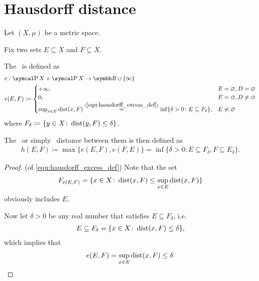\section{Hausdorff distance}\label{sec:hausdorff_distance}

Let $(X, \mu)$ be a metric space.

\begin{definition}\label{def:hausdorff_distance}\cite[144]{Dontchev2014}
  Fix two sets $E \subseteq X$ and $F \subseteq X$.

  The~ is defined as
  \begin{align}\label{equ:hausdorff_excess_def}
    &e: \Power X \times \Power X \to \BB{R} \cup \{ \infty \} \\ \nonumber
    &e(E, F) \coloneqq \begin{cases}
      +\infty, &E = \varnothing, D = \varnothing \\
      0, &E = \varnothing, D \neq \varnothing \\
      \sup_{x \in E} \Dist(x, F) \stackrel{(\ref{equ:hausdorff_excess_def})}{=} \inf \{\delta > 0 \colon E \subseteq F_\delta \}, &E \neq \varnothing \nonumber\refstepcounter{equation}
    \end{cases}
  \end{align}
  where $F_\delta \coloneqq \{ y \in X \colon \operatorname{dist}(y, F) \leq \delta \}$.

  The~ or simply~ distance between them is then defined as
  \begin{align*}
    h(E, F) \coloneqq \max\{ e(E, F), e(F, E) \} = \inf \{\delta > 0 \colon E \subseteq F_\delta, F \subseteq E_\delta \}.
  \end{align*}
\end{definition}
\begin{proof}(of \ref{equ:hausdorff_excess_def})
  Note that the set
  \begin{align*}
    F_{e(E, F)} = \{ x \in X \colon \operatorname{dist}(x, F) \leq \sup_{x \in E} \operatorname{dist}(x, F) \}
  \end{align*}
  obviously includes $E$.

  Now let $\delta > 0$ be any real number that satisfies $E \subseteq F_\delta$, i.e.
  \begin{align*}
    E \subseteq F_\delta = \{ x \in X \colon \operatorname{dist}(x, F) \leq \delta \},
  \end{align*}
  which implies that
  \begin{align*}
    e(E, F) = \sup_{x \in E} \operatorname{dist}(x, F) \leq \delta.
  \end{align*}
\end{proof}

